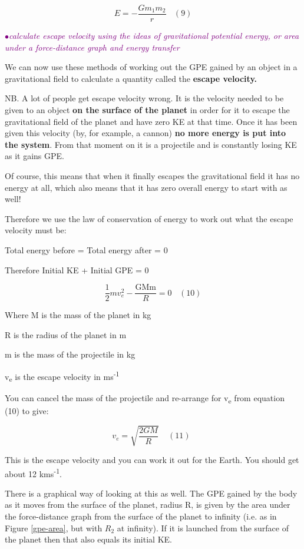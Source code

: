\documentclass[a4paper,11pt,twoside]{memoir}
\newcounter{spec}[chapter]
\newcommand{\spec}[1]{\Needspace{5\baselineskip}\textcolor{purple}{$\bullet$\hspace{0.5cm}\textit{#1}}}
\begin{document}
\[E = - \frac{Gm_{1}m_{2}}{r}\ \ \ \ (9)\]

\spec{calculate escape velocity using the ideas of gravitational potential energy, or area under a force-distance graph and energy transfer}

We can now use these methods of working out the GPE gained by an object
in a gravitational field to calculate a quantity called the
\textbf{escape velocity.}

NB. A lot of people get escape velocity wrong. It is the velocity needed
to be given to an object \textbf{on the surface of the planet} in order
for it to escape the gravitational field of the planet and have zero KE
at that time. Once it has been given this velocity (by, for example, a
cannon) \textbf{no more energy is put into the system}. From that moment
on it is a projectile and is constantly losing KE as it gains GPE.

Of course, this means that when it finally escapes the gravitational
field it has no energy at all, which also means that it has zero overall
energy to start with as well!

Therefore we use the law of conservation of energy to work out what the
escape velocity must be:

Total energy before = Total energy after = 0

Therefore Initial KE + Initial GPE = 0

\[\frac{1}{2}mv_{e}^{2} - \frac{\text{GMm}}{R} = 0\ \ \ \ \left( 10 \right)\]

Where M is the mass of the planet in kg

R is the radius of the planet in m

m is the mass of the projectile in kg

v\textsubscript{e} is the escape velocity in ms\textsuperscript{-1}

You can cancel the mass of the projectile and re-arrange for
v\textsubscript{e} from equation (10) to give:

\[v_{e} = \sqrt{\frac{2GM}{R}}\ \ \ \ \ (11)\ \ \]

This is the escape velocity and you can work it out for the Earth. You
should get about 12 kms\textsuperscript{-1}.

There is a graphical way of looking at this as well. The GPE gained by
the body as it moves from the surface of the planet, radius R, is given
by the area under the force-distance graph from the surface of the
planet to infinity (i.e. as in Figure \ref{gpe-area}, but with $R_2$ at infinity). If it is launched from the surface of the planet
then that also equals its initial KE.
\end{document}

